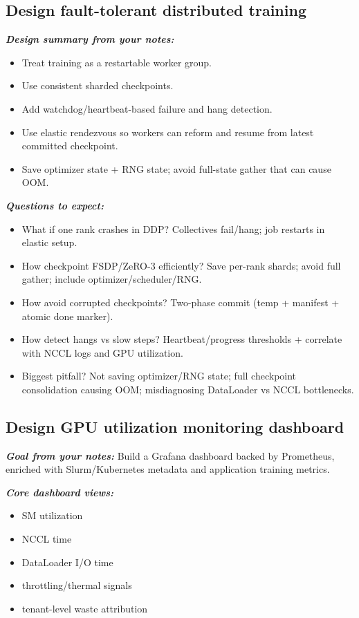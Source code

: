 \documentclass[12pt]{article}
\let\origtextbf\textbf
\renewcommand{\textbf}[1]{\origtextbf{\textit{#1}}}
\begin{document}
\subsection{Design fault-tolerant distributed training}
\textbf{Design summary from your notes:}
\begin{itemize}
\item Treat training as a restartable worker group.
\item Use consistent sharded checkpoints.
\item Add watchdog/heartbeat-based failure and hang detection.
\item Use elastic rendezvous so workers can reform and resume from latest committed checkpoint.
\item Save optimizer state + RNG state; avoid full-state gather that can cause OOM.
\end{itemize}

\textbf{Questions to expect:}
\begin{itemize}
\item What if one rank crashes in DDP? Collectives fail/hang; job restarts in elastic setup.
\item How checkpoint FSDP/ZeRO-3 efficiently? Save per-rank shards; avoid full gather; include optimizer/scheduler/RNG.
\item How avoid corrupted checkpoints? Two-phase commit (temp + manifest + atomic done marker).
\item How detect hangs vs slow steps? Heartbeat/progress thresholds + correlate with NCCL logs and GPU utilization.
\item Biggest pitfall? Not saving optimizer/RNG state; full checkpoint consolidation causing OOM; misdiagnosing DataLoader vs NCCL bottlenecks.
\end{itemize}

\subsection{Design GPU utilization monitoring dashboard}
\textbf{Goal from your notes:}
Build a Grafana dashboard backed by Prometheus, enriched with Slurm/Kubernetes metadata and application training metrics.

\textbf{Core dashboard views:}
\begin{itemize}
\item SM utilization
\item NCCL time
\item DataLoader I/O time
\item throttling/thermal signals
\item tenant-level waste attribution
\end{itemize}
\end{document}

